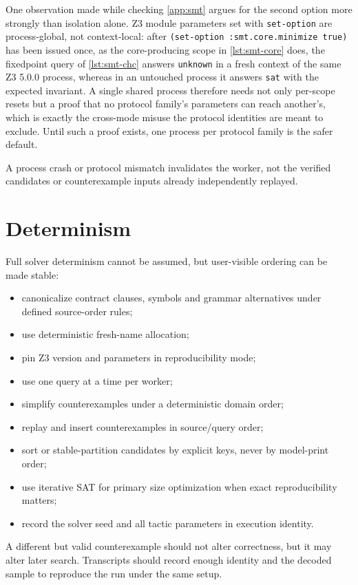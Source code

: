 \documentclass[11pt,oneside]{report}
\newcommand{\code}[1]{\texttt{#1}}
\begin{document}
One observation made while checking \cref{app:smt} argues for the second option more strongly than isolation alone. Z3 module parameters set with \code{set-option} are process-global, not context-local: after \code{(set-option :smt.core.minimize true)} has been issued once, as the core-producing scope in \cref{lst:smt-core} does, the fixedpoint query of \cref{lst:smt-chc} answers \texttt{unknown} in a fresh context of the same Z3 5.0.0 process, whereas in an untouched process it answers \texttt{sat} with the expected invariant. A single shared process therefore needs not only per-scope resets but a proof that no protocol family's parameters can reach another's, which is exactly the cross-mode misuse the protocol identities are meant to exclude. Until such a proof exists, one process per protocol family is the safer default.

A process crash or protocol mismatch invalidates the worker, not the verified candidates or counterexample inputs already independently replayed.

\section{Determinism}

Full solver determinism cannot be assumed, but user-visible ordering can be made stable:

\begin{itemize}[leftmargin=2em]
\item canonicalize contract clauses, symbols and grammar alternatives under defined source-order rules;
\item use deterministic fresh-name allocation;
\item pin Z3 version and parameters in reproducibility mode;
\item use one query at a time per worker;
\item simplify counterexamples under a deterministic domain order;
\item replay and insert counterexamples in source/query order;
\item sort or stable-partition candidates by explicit keys, never by model-print order;
\item use iterative SAT for primary size optimization when exact reproducibility matters;
\item record the solver seed and all tactic parameters in execution identity.
\end{itemize}

A different but valid counterexample should not alter correctness, but it may alter later search. Transcripts should record enough identity and the decoded sample to reproduce the run under the same setup.
\end{document}
